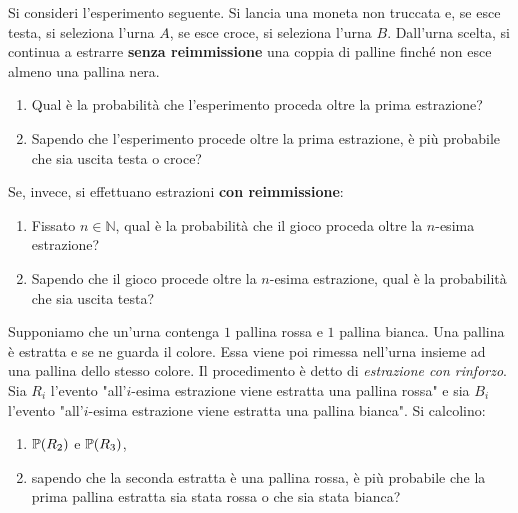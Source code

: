 Si consideri l'esperimento seguente. Si lancia una moneta non truccata e, se esce testa, si seleziona l'urna $A$, se esce croce, si seleziona l'urna $B$. Dall'urna scelta, si continua a estrarre \textbf{senza reimmissione} una coppia di palline finché non esce almeno una pallina nera.
\begin{enumerate}
	\item Qual è la probabilità che l'esperimento proceda oltre la prima estrazione?
	\item Sapendo che l'esperimento procede oltre la prima estrazione, è più probabile che sia uscita testa o croce?
\end{enumerate}
Se, invece, si effettuano estrazioni \textbf{con reimmissione}:
\begin{enumerate}
	\item Fissato $n\in \mathbb{N}$, qual è la probabilità che il gioco proceda oltre la $n$-esima estrazione?
	\item Sapendo che il gioco procede oltre la $n$-esima estrazione, qual è la probabilità che sia uscita testa?
\end{enumerate}


Supponiamo che un'urna contenga $1$ pallina rossa e $1$ pallina bianca. Una pallina è estratta e se ne guarda il colore. Essa viene poi rimessa nell'urna insieme ad una pallina dello stesso colore. Il procedimento è detto di \textit{estrazione con rinforzo}. Sia $R_{i}$ l'evento "all'$i$-esima estrazione viene estratta una pallina rossa" e sia $B_{i}$ l'evento "all'$i$-esima estrazione viene estratta una pallina bianca". Si calcolino:
\begin{enumerate}
	\item $\mathbb{P}(R_{2})$ e $\mathbb{P}(R_{3})$,
	\item sapendo che la seconda estratta è una pallina rossa, è più probabile che la prima pallina estratta sia stata rossa o che sia stata bianca?
\end{enumerate}


